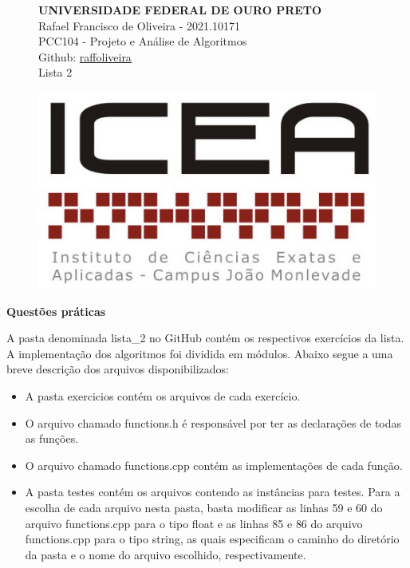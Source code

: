 \documentclass[12pt,a4paper]{article}
\begin{document}
\begin{figure}[H]
\begin{minipage}[]{0.07\linewidth}
	\end{minipage}
\hfill
	\begin{minipage}[]{0.6\linewidth}
		\centering
	\textbf{UNIVERSIDADE FEDERAL DE OURO PRETO\\}
		Rafael Francisco de Oliveira - 2021.10171\\
		PCC104 - Projeto e Análise de Algoritmos\\
		Github: \href{https://github.com/raffoliveira/Master_Degree}{raffoliveira}\\
		Lista 2
		
	\end{minipage}
\hfill	
	\begin{minipage}[c]{0.15\linewidth}
	\includegraphics[width=\linewidth]{images/icea.jpg}	
	\end{minipage}

\vspace{0.5cm}
\hrulefill
\end{figure}

{\Large \textbf{Questões práticas}}

\vspace{0.5cm}

A pasta denominada \textsf{lista\_2} no GitHub contém os respectivos exercícios da lista. A implementação dos algoritmos foi dividida em módulos. Abaixo segue a uma breve descrição dos arquivos disponibilizados:

\begin{itemize}
	\item A pasta \textsf{exercicios} contém os arquivos de cada exercício.
	\item O arquivo chamado \textsf{functions.h} é responsável por ter as declarações de todas as funções.
	\item O arquivo chamado \textsf{functions.cpp} contém as implementações de cada função. 
	\item A pasta \textsf{testes} contém os arquivos contendo as instâncias para testes. Para a escolha de cada arquivo nesta pasta, basta modificar as linhas \textsf{59} e \textsf{60} do arquivo \textsf{functions.cpp}  para o tipo \textsf{float} e as linhas \textsf{85} e \textsf{86} do arquivo \textsf{functions.cpp}  para o tipo \textsf{string}, as quais especificam o caminho do diretório da pasta e o nome do arquivo escolhido, respectivamente. 
\end{itemize}
\end{document}
